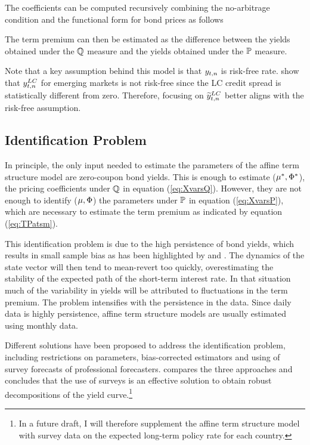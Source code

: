 The coefficients can be computed recursively combining the no-arbitrage condition and the functional form for bond prices as follows
	
	

The term premium can then be estimated as the difference between the yields obtained under the $\mathbb{Q}$ measure and the yields obtained under the $\mathbb{P}$ measure.
	

Note that a key assumption behind this model is that $y_{t,n}$ is risk-free rate. \cite{DuSchreger:2016a} show that $y_{t,n} ^{LC}$ for emerging markets is not risk-free since the LC credit spread is statistically different from zero. Therefore, focusing on $\widetilde{y}_{t,n} ^{LC}$ better aligns with the risk-free assumption.

\subsection{Identification Problem} \label{sec:Identification}
In principle, the only input needed to estimate the parameters of the affine term structure model are zero-coupon bond yields. This is enough to estimate ($\mu^{*}, \Phi^{*}$), the pricing coefficients under $\mathbb{Q}$ in equation (\ref{eq:XvarsQ}). However, they are not enough to identify ($\mu, \Phi$) the parameters under $\mathbb{P}$ in equation (\ref{eq:XvarsP}), which are necessary to estimate the term premium as indicated by equation (\ref{eq:TPatsm}).

This identification problem is due to the high persistence of bond yields, which results in small sample bias as has been highlighted by \cite{KimOrphanides:2012} and \cite{Guimaraes:2014}. The dynamics of the state vector will then tend to mean-revert too quickly, overestimating the stability of the expected path of the short-term interest rate. In that situation much of the variability in yields will be attributed to fluctuations in the term premium. The problem intensifies with the persistence in the data. Since daily data is highly persistence, affine term structure models are usually estimated using monthly data.

Different solutions have been proposed to address the identification problem, including restrictions on parameters, bias-corrected estimators and using of survey forecasts of professional forecasters. \cite{Guimaraes:2014} compares the three approaches and concludes that the use of surveys is an effective solution to obtain robust decompositions of the yield curve.\footnote{In a future draft, I will therefore supplement the affine term structure model with survey data on the expected long-term policy rate for each country.}

